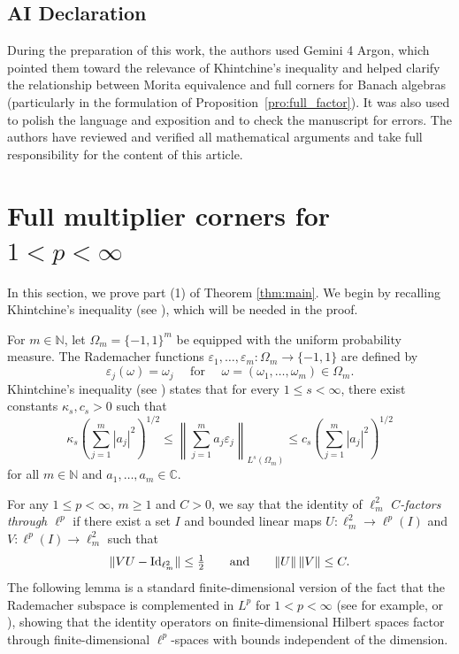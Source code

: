 \documentclass[11pt,reqno]{amsart}
\theoremstyle{definition}
\theoremstyle{plain}
\def\IN{\mathbb N}\def\IR{\mathbb R}\def\IE{\mathbb E}\def\IC{\mathbb C}\def\IL{\mathbb L}\def\IQ{\mathbb Q}\def\IA{\mathbb A}\def\IZ{\mathbb Z}
\begin{document}
\subsection*{AI Declaration}
During the preparation of this work, the authors used Gemini 4 Argon, which pointed them toward the relevance of Khintchine's inequality and helped clarify the relationship between Morita equivalence and full corners for Banach algebras (particularly in the formulation of Proposition~\ref{pro:full_factor}). It was also used to polish the language and exposition and to check the manuscript for errors. The authors have reviewed and verified all mathematical arguments and take full responsibility for the content of this article.






\section{Full multiplier corners for \texorpdfstring{$1<p<\infty$}{1 < p < infty}}\label{sec:full_corner}

In this section, we prove part (1) of Theorem \ref{thm:main}. We begin by recalling Khintchine's inequality (see \cite[Appendix C]{Gra14}), which will be needed in the proof.

For $m\in\IN$, let $\Omega_m=\{-1,1\}^m$ be equipped with the uniform probability measure. The Rademacher functions $\varepsilon_1,\ldots,\varepsilon_m : \Omega_m \to \{-1, 1\}$ are defined by
\[
\varepsilon_j(\omega)=\omega_j\quad\text{ for }\quad \omega=(\omega_1,\ldots,\omega_m)\in\Omega_m. 
\]
Khintchine's inequality (see \cite[Appendix C]{Gra14}) states that for every $1\le s<\infty$, there exist constants $\kappa_s,c_s>0$ such that
\begin{equation}\label{eq:Khintchine}
\kappa_s\left(\sum_{j=1}^m|a_j|^2\right)^{1/2}
\le \left\|\sum_{j=1}^m a_j\varepsilon_j\right\|_{L^s(\Omega_m)}
\le c_s\left(\sum_{j=1}^m|a_j|^2\right)^{1/2}
\end{equation}
for all $m\in\IN$ and $a_1,\ldots,a_m\in\IC$.

For any $1\le p<\infty$,  $m \ge 1$ and $C > 0$, we say that the identity of $\ell^2_m$ \emph{$C$-factors through $\ell^p$} if there exist a set $I$ and bounded linear maps $U:\ell^2_m\to\ell^p(I)$ and $V:\ell^p(I)\to\ell^2_m$ such that
\[
\|VU-\textup{Id}_{\ell^2_m}\|\le \tfrac 12 \qquad\text{and}\qquad\|U\|\,\|V\|\le C.
\]
The following lemma is a standard finite-dimensional version of the fact that the Rademacher subspace is complemented in $L^p$ for $1<p<\infty$ (see for example, \cite[Proposition~6.4.2]{AK16} or \cite[Theorem~2.b.3]{LT77}), showing that the identity operators on finite-dimensional Hilbert spaces factor through finite-dimensional $\ell^p$-spaces with bounds independent of the dimension.
\end{document}

